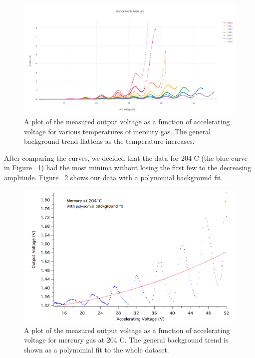 \documentclass[prb,preprint]{revtex4-1}
\begin{document}
\begin{figure}[h!]
\centering
\includegraphics[width=6in]{alltemps.pdf}
\caption{A plot of the measured output voltage as a function of accelerating voltage for various temperatures of mercury gas. The general background trend flattens as the temperature increases.}
\label{alltemps}
\end{figure}


After comparing the curves, we decided that the data for 204 \degree C (the blue curve in Figure ~\ref{alltemps}) had the most minima without losing the first few to the decreasing amplitude. Figure ~\ref{204CbackFit} shows our data with a polynomial background fit. 

\begin{figure}[h!]
\centering
\includegraphics[width=6in]{204C_backFit.png}
\caption{A plot of the measured output voltage as a function of accelerating voltage for mercury gas at 204 \degree C. The general background trend is shown as a polynomial fit to the whole dataset.}
\label{204CbackFit}
\end{figure}
\end{document}
